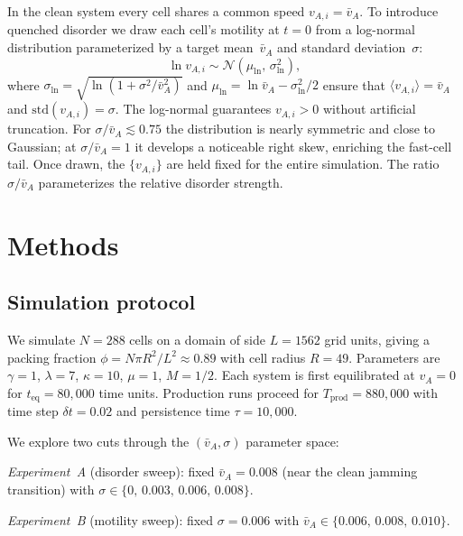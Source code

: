 \documentclass[aps,pre,twocolumn,superscriptaddress,longbibliography,floatfix]{revtex4-2}
\begin{document}
In the clean system every cell shares a common speed
$v_{A,i}\!=\!\bar{v}_A$.  To introduce quenched disorder we draw each
cell's motility at $t\!=\!0$ from a log-normal distribution
parameterized by a target mean~$\bar{v}_A$ and standard
deviation~$\sigma$:
\begin{equation}
  \ln v_{A,i} \sim \mathcal{N}(\mu_{\mathrm{ln}},\,\sigma_{\mathrm{ln}}^2),
\label{eq:disorder}
\end{equation}
where $\sigma_{\mathrm{ln}} = \sqrt{\ln(1 + \sigma^2/\bar{v}_A^2)}$
and $\mu_{\mathrm{ln}} = \ln\bar{v}_A - \sigma_{\mathrm{ln}}^2/2$
ensure that $\langle v_{A,i}\rangle = \bar{v}_A$ and
$\mathrm{std}(v_{A,i}) = \sigma$.  The log-normal guarantees
$v_{A,i} > 0$ without artificial truncation.  For
$\sigma/\bar{v}_A \lesssim 0.75$ the distribution is nearly symmetric
and close to Gaussian; at $\sigma/\bar{v}_A = 1$ it develops a
noticeable right skew, enriching the fast-cell tail.  Once drawn, the
$\{v_{A,i}\}$ are held fixed for the entire simulation.  The ratio
$\sigma/\bar{v}_A$ parameterizes the relative disorder strength.

\section{Methods}
\label{sec:methods}

\subsection{Simulation protocol}

We simulate $N\!=\!288$ cells on a domain of side $L\!=\!1562$ grid
units, giving a packing fraction
$\phi = N\pi R^2/L^2\approx 0.89$ with cell radius $R\!=\!49$.
Parameters are $\gamma\!=\!1$, $\lambda\!=\!7$, $\kappa\!=\!10$,
$\mu\!=\!1$, $M\!=\!1/2$.  Each system is first equilibrated at
$v_A\!=\!0$ for $t_{\mathrm{eq}}\!=\!80{,}000$ time units.
Production runs proceed for $T_{\mathrm{prod}}\!=\!880{,}000$ with
time step $\delta t\!=\!0.02$ and persistence time $\tau\!=\!10{,}000$.

We explore two cuts through the $(\bar{v}_A,\sigma)$ parameter space:

\textit{Experiment~A} (disorder sweep): fixed
$\bar{v}_A = 0.008$ (near the clean jamming transition) with
$\sigma\in\{0,\,0.003,\,0.006,\,0.008\}$.

\textit{Experiment~B} (motility sweep): fixed $\sigma = 0.006$ with
$\bar{v}_A\in\{0.006,\,0.008,\,0.010\}$.
\end{document}
